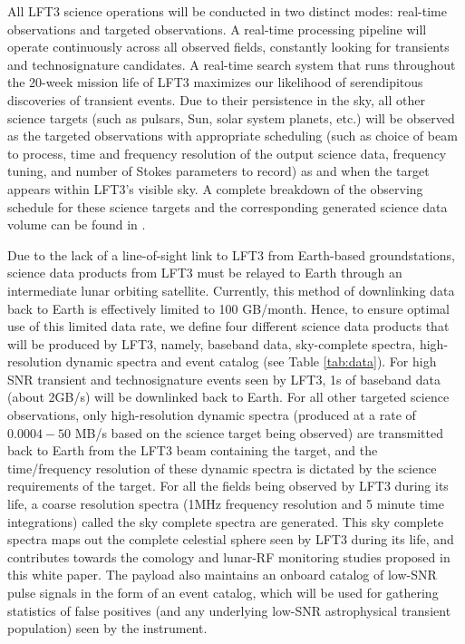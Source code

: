 All LFT3 science operations will be conducted in two distinct modes: real-time observations and targeted observations. A real-time processing pipeline will operate continuously across all observed fields, constantly looking for transients and technosignature candidates. A real-time search system that runs throughout the 20-week mission life of LFT3 maximizes our likelihood of serendipitous discoveries of transient events. Due to their persistence in the sky, all other science targets (such as pulsars, Sun, solar system planets, etc.) will be observed as the targeted observations with appropriate scheduling (such as choice of beam to process, time and frequency resolution of the output science data, frequency tuning, and number of Stokes parameters to record) as and when the target appears within LFT3's visible sky. A complete breakdown of the observing schedule for these science targets and the corresponding generated science data volume can be found in \cite{prabu2025lft3}.

Due to the lack of a line-of-sight link to LFT3 from Earth-based groundstations, science data products from LFT3 must be relayed to Earth through an intermediate lunar orbiting satellite. Currently, this method of downlinking data back to Earth is effectively limited to 100 GB/month. Hence, to ensure optimal use of this limited data rate, we define four different science data products that will be produced by LFT3, namely, baseband data, sky-complete spectra, high-resolution dynamic spectra and event catalog (see Table \ref{tab:data}). For high SNR transient and technosignature events seen by LFT3, 1s of baseband data (about 2GB/s) will be downlinked back to Earth. For all other targeted science observations, only high-resolution dynamic spectra (produced at a rate of $0.0004 - 50$ MB/s based on the science target being observed) are transmitted back to Earth from the LFT3 beam containing the target, and the time/frequency resolution of these dynamic spectra is dictated by the science requirements of the target. For all the fields being observed by LFT3 during its life, a coarse resolution spectra (1MHz frequency resolution and 5 minute time integrations) called the sky complete spectra are generated. This sky complete spectra maps out the complete celestial sphere seen by LFT3 during its life, and contributes towards the comology and lunar-RF monitoring studies proposed in this white paper. The payload also maintains an onboard catalog of low-SNR pulse signals in the form of an event catalog, which will be used for gathering statistics of false positives (and any underlying low-SNR astrophysical transient population) seen by the instrument.

